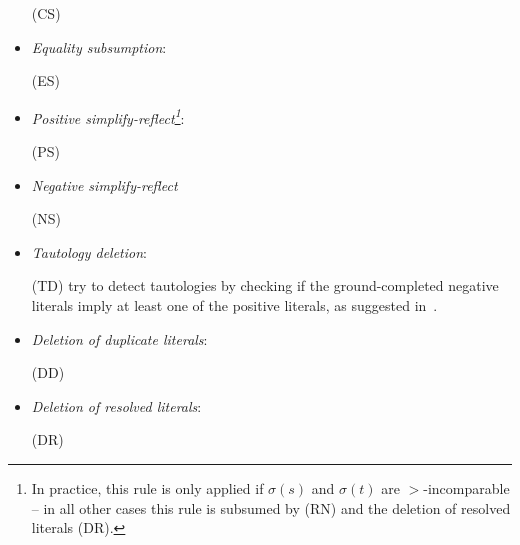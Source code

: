 \documentclass{article}
\begin{document}
\begin{definition}
\begin{itemize}
   \bigskip (CS)  
   
 \item \emph{Equality subsumption}:
       
   \bigskip (ES) 
   
 \item \emph{Positive simplify-reflect\footnote{In
       practice, this rule is only applied if $\sigma(s)$ and
       $\sigma(t)$ are $>$-incomparable -- in all other cases this
       rule is subsumed by (RN) and the deletion of resolved literals
       (DR).}}:

   \bigskip (PS) 
       

   \item \emph{Negative simplify-reflect}
     
     \bigskip (NS) 
       
          
 \item \emph{Tautology deletion}:
   
   \bigskip (TD) 
    try to detect tautologies by checking if the ground-completed
   negative literals imply at least one of the positive literals, as
   suggested in~\cite{NN:RTA-93}.
   
 \item \emph{Deletion of duplicate literals}:
   
   \bigskip (DD) 
   
 \item \emph{Deletion of resolved literals}:
   
   \bigskip (DR) 
   

\end{itemize}
\end{definition}
\end{document}
